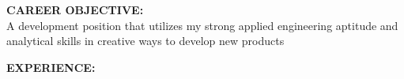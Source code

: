 


{\large \textbf{CAREER OBJECTIVE:}}\\

A development position that utilizes my strong applied engineering aptitude and analytical skills in creative ways to develop new products \bigskip



{\large \textbf{EXPERIENCE:}}\\








\pagebreak



